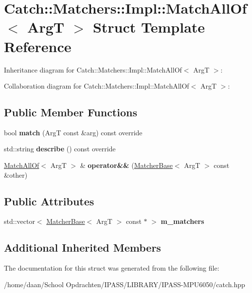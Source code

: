 \hypertarget{structCatch_1_1Matchers_1_1Impl_1_1MatchAllOf}{}\section{Catch\+:\+:Matchers\+:\+:Impl\+:\+:Match\+All\+Of$<$ ArgT $>$ Struct Template Reference}
\label{structCatch_1_1Matchers_1_1Impl_1_1MatchAllOf}


Inheritance diagram for Catch\+:\+:Matchers\+:\+:Impl\+:\+:Match\+All\+Of$<$ ArgT $>$\+:


Collaboration diagram for Catch\+:\+:Matchers\+:\+:Impl\+:\+:Match\+All\+Of$<$ ArgT $>$\+:
\subsection*{Public Member Functions}
\begin{DoxyCompactItemize}
\item 
\mbox{\label{structCatch_1_1Matchers_1_1Impl_1_1MatchAllOf_acfb377bda2c58ae62e6df9c3a8a89f8f}} 
bool {\bfseries match} (ArgT const \&arg) const override
\item 
\mbox{\label{structCatch_1_1Matchers_1_1Impl_1_1MatchAllOf_acbb9a083e93b546fd33c9235b644c40f}} 
std\+::string {\bfseries describe} () const override
\item 
\mbox{\label{structCatch_1_1Matchers_1_1Impl_1_1MatchAllOf_a9d0e38b36474336498d627610db434f3}} 
\hyperlink{structCatch_1_1Matchers_1_1Impl_1_1MatchAllOf}{Match\+All\+Of}$<$ ArgT $>$ \& {\bfseries operator\&\&} (\hyperlink{structCatch_1_1Matchers_1_1Impl_1_1MatcherBase}{Matcher\+Base}$<$ ArgT $>$ const \&other)
\end{DoxyCompactItemize}
\subsection*{Public Attributes}
\begin{DoxyCompactItemize}
\item 
\mbox{\label{structCatch_1_1Matchers_1_1Impl_1_1MatchAllOf_a98d6a2611f195a4a5c49f92fd877be9a}} 
std\+::vector$<$ \hyperlink{structCatch_1_1Matchers_1_1Impl_1_1MatcherBase}{Matcher\+Base}$<$ ArgT $>$ const  $\ast$ $>$ {\bfseries m\+\_\+matchers}
\end{DoxyCompactItemize}
\subsection*{Additional Inherited Members}


The documentation for this struct was generated from the following file\+:\begin{DoxyCompactItemize}
\item 
/home/daan/\+School Opdrachten/\+I\+P\+A\+S\+S/\+L\+I\+B\+R\+A\+R\+Y/\+I\+P\+A\+S\+S-\/\+M\+P\+U6050/catch.\+hpp\end{DoxyCompactItemize}

